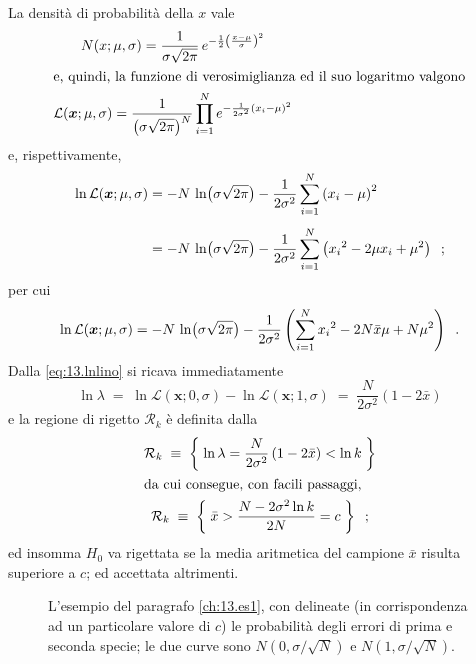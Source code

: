 La densit\`a di probabilit\`a della $x$ vale
\begin{gather*}
  N(x; \mu, \sigma) = \frac{1}{\sigma \sqrt{2 \pi}} \, e^{
    - \frac{1}{2} \left( \frac{x - \mu}{\sigma}
    \right)^2 } \\
  \intertext{e, quindi, la funzione di verosimiglianza ed il
    suo logaritmo valgono}
  \mathcal{L} (\boldsymbol{x}; \mu, \sigma) =
    \frac{1}{\bigl( \sigma \sqrt{2 \pi} \bigr)^N}
    \prod_{i=1}^N e^{- \frac{1}{2 \sigma^2}
    \left( x_i - \mu \right)^2 }
\end{gather*}
e, rispettivamente,
\begin{align*}
  \ln \mathcal{L} (\boldsymbol{x}; \mu, \sigma) &= - N \,
    \ln \bigl( \sigma \sqrt{2 \pi} \bigr) - \frac{1}{2
    \sigma^2} \sum_{i=1}^N \left( x_i - \mu \right)^2
    \\[1ex]
  &= - N \, \ln \bigl( \sigma \sqrt{2 \pi} \bigr) -
    \frac{1}{2 \sigma^2} \sum_{i=1}^N \left( {x_i}^2 - 2 \mu
    x_i + \mu^2 \right) \;\; ; \\
\end{align*}
per cui
\begin{equation} \label{eq:13.lnlino}
  \ln \mathcal{L} (\boldsymbol{x}; \mu, \sigma) = - N \, \ln
    \bigl( \sigma \sqrt{2 \pi} \bigr) - \frac{1}{2
    \sigma^2} \left( \sum_{i=1}^N {x_i}^2 - 2 N \bar x \mu +
    N \mu^2 \right) \;\; .
\end{equation}
Dalla \eqref{eq:13.lnlino} si ricava immediatamente
\begin{equation*}
  \ln \lambda \; = \; \ln \mathcal{L} (\boldsymbol{x}; 0,
    \sigma) - \ln \mathcal{L} (\boldsymbol{x}; 1, \sigma) \;
    = \; \frac{N}{2 \sigma^2} \left( 1 - 2 \bar x \right)
\end{equation*}
e la regione di rigetto $\mathcal{R}_k$ \`e definita dalla
\begin{gather*}
  \mathcal{R}_k \; \equiv \; \left\{ \; \ln \lambda =
    \frac{N}{2 \sigma^2} \left( 1 - 2 \bar x \right) <
    \ln k \; \right\} \\
  \intertext{da cui consegue, con facili passaggi,}
  \mathcal{R}_k \; \equiv \; \left\{ \; \bar x > \frac{N -
    2 \sigma^2 \ln k}{2 N} = c \; \right\} \;\; ;
\end{gather*}
ed insomma $H_0$ va rigettata se la media aritmetica del
campione $\bar x$ risulta superiore a $c$; ed accettata
altrimenti.

\begin{figure}[htbp]
  \vspace*{2ex}
  \begin{center} {
    
  } \end{center}
  \caption[Un esempio: errori di prima e seconda specie]
    {L'esempio del paragrafo \ref{ch:13.es1}, con delineate
    (in corrispondenza ad un particolare valore di $c$) le
    probabilit\`a degli errori di prima e seconda specie; le
    due curve sono $N(0, \sigma / \sqrt{N})$ e $N(1, \sigma
    / \sqrt{N})$.}
  \label{fig:13.duegau}
\end{figure}

